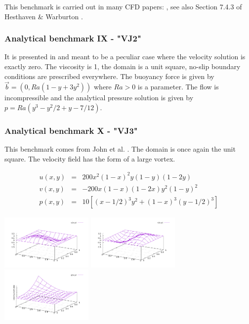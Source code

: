 This benchmark is carried out in many CFD papers: \cite{coks04b,bodi11,ngpe12}, see also Section 7.4.3
of Hesthaven \& Warburton \cite{hewa08}.


\bscthesis {}

\subsubsection{Analytical benchmark IX \label{mms9} - "VJ2"}

It is presented in \cite{jolm17} and meant to be a peculiar case where the velocity solution 
is exactly zero. The viscosity is 1, the domain is a unit square, no-slip boundary conditions 
are prescribed everywhere. The buoyancy force is given by $\vec{b}=(0,Ra(1-y+3y^2))$ where 
$Ra>0$ is a parameter. The flow is incompressible and the analytical pressure solution 
is given by $p=Ra(y^3-y^2/2+y-7/12)$.

\subsubsection{Analytical benchmark X \label{mms10} - "VJ3"}

This benchmark comes from John et al. \cite{jolm17}.
The domain is once again the unit square. The velocity field has the form of a large vortex.

\begin{eqnarray}
u(x,y) &=& 200x^2(1-x)^2y(1-y)(1-2y) \\
v(x,y) &=& -200x(1-x)(1-2x)y^2(1-y)^2 \\
p(x,y) &=& 10\left[(x-1/2)^3y^2+(1-x)^3(y-1/2)^3 \right]
\end{eqnarray}

\begin{center}
\includegraphics[width=4.5cm]{images/benchmark_VJ3/u.pdf}
\includegraphics[width=4.5cm]{images/benchmark_VJ3/v.pdf}
\includegraphics[width=4.5cm]{images/benchmark_VJ3/p.pdf}
\end{center}

